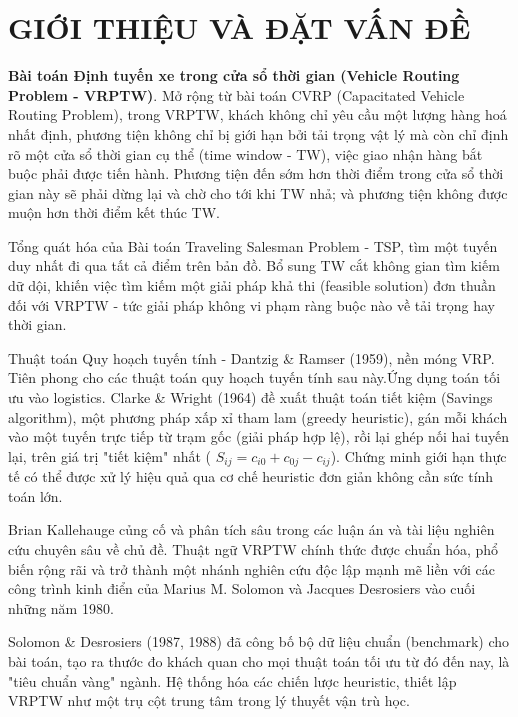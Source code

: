 \documentclass[13pt, a4paper]{extarticle} %
\begin{document}
\newpage
\setcounter{page}{1}

\section*{GIỚI THIỆU VÀ ĐẶT VẤN ĐỀ}
\textbf{Bài toán Định tuyến xe trong cửa sổ thời gian (Vehicle Routing Problem - VRPTW)}. Mở rộng từ bài toán CVRP (Capacitated Vehicle Routing Problem), trong VRPTW, khách không chỉ yêu cầu một lượng hàng hoá nhất định, phương tiện không chỉ bị giới hạn bởi tải trọng vật lý mà còn chỉ định rõ một cửa sổ thời gian cụ thể (time window - TW), việc giao nhận hàng bắt buộc phải được tiến hành. Phương tiện đến sớm hơn thời điểm trong cửa sổ thời gian này sẽ phải dừng lại và chờ cho tới khi TW nhả; và phương tiện không được muộn hơn thời điểm kết thúc TW. \vspace{0.25cm}
 
 Tổng quát hóa của Bài toán Traveling Salesman Problem - TSP, tìm một tuyến duy nhất đi qua tất cả điểm trên bản đồ. Bổ sung TW cắt không gian tìm kiếm dữ dội, khiến việc tìm kiếm một giải pháp khả thi (feasible solution) đơn thuần đối với VRPTW - tức giải pháp không vi phạm ràng buộc nào về tải trọng hay thời gian. \vspace{0.25cm}

Thuật toán Quy hoạch tuyến tính - Dantzig \& Ramser (1959), nền móng VRP. Tiên phong cho các thuật toán quy hoạch tuyến tính sau này.Ứng dụng toán tối ưu vào logistics. Clarke \& Wright (1964) đề xuất thuật toán tiết kiệm (Savings algorithm), một phương pháp xấp xỉ tham lam (greedy heuristic), gán mỗi khách vào một tuyến trực tiếp từ trạm gốc (giải pháp hợp lệ), rồi lại ghép nối hai tuyến lại, trên giá trị "tiết kiệm" nhất ( $S_{ij} = c_{i0} + c_{0j} - c_{ij}$). Chứng minh giới hạn thực tế có thể được xử lý hiệu quả qua cơ chế heuristic đơn giản không cần sức tính toán lớn. \vspace{0.25cm}

Brian Kallehauge củng cố và phân tích sâu trong các luận án và tài liệu nghiên cứu chuyên sâu về chủ đề. Thuật ngữ VRPTW chính thức được chuẩn hóa, phổ biến rộng rãi và trở thành một nhánh nghiên cứu độc lập mạnh mẽ liền với các công trình kinh điển của Marius M. Solomon và Jacques Desrosiers vào cuối những năm 1980.\vspace{0.25cm}

Solomon \& Desrosiers (1987, 1988) đã công bố bộ dữ liệu chuẩn (benchmark) cho bài toán, tạo ra thước đo khách quan cho mọi thuật toán tối ưu từ đó đến nay, là "tiêu chuẩn vàng" ngành. Hệ thống hóa các chiến lược heuristic, thiết lập VRPTW như một trụ cột trung tâm trong lý thuyết vận trù học.\vspace{0.25cm}
\end{document}
